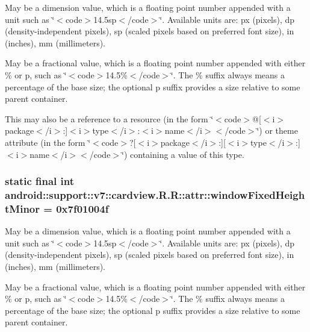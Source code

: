May be a dimension value, which is a floating point number appended with a unit such as \char`\"{}$<$code$>$14.5sp$<$/code$>$\char`\"{}. Available units are: px (pixels), dp (density-independent pixels), sp (scaled pixels based on preferred font size), in (inches), mm (millimeters). 

May be a fractional value, which is a floating point number appended with either \% or p, such as \char`\"{}$<$code$>$14.5\%$<$/code$>$\char`\"{}. The \% suffix always means a percentage of the base size; the optional p suffix provides a size relative to some parent container. 

This may also be a reference to a resource (in the form \char`\"{}$<$code$>$@\mbox{[}$<$i$>$package$<$/i$>$:\mbox{]}$<$i$>$type$<$/i$>$:$<$i$>$name$<$/i$>$$<$/code$>$\char`\"{}) or theme attribute (in the form \char`\"{}$<$code$>$?\mbox{[}$<$i$>$package$<$/i$>$:\mbox{]}\mbox{[}$<$i$>$type$<$/i$>$:\mbox{]}$<$i$>$name$<$/i$>$$<$/code$>$\char`\"{}) containing a value of this type. \hypertarget{classandroid_1_1support_1_1v7_1_1cardview_1_1_r_1_1attr_a01b43cb3c5747671e4ca146335eb990}{
\subsubsection[{windowFixedHeightMinor}]{\setlength{\rightskip}{0pt plus 5cm}static final int android::support::v7::cardview.R.R::attr::windowFixedHeightMinor = 0x7f01004f}}
\label{classandroid_1_1support_1_1v7_1_1cardview_1_1_r_1_1attr_a01b43cb3c5747671e4ca146335eb990}


May be a dimension value, which is a floating point number appended with a unit such as \char`\"{}$<$code$>$14.5sp$<$/code$>$\char`\"{}. Available units are: px (pixels), dp (density-independent pixels), sp (scaled pixels based on preferred font size), in (inches), mm (millimeters). 

May be a fractional value, which is a floating point number appended with either \% or p, such as \char`\"{}$<$code$>$14.5\%$<$/code$>$\char`\"{}. The \% suffix always means a percentage of the base size; the optional p suffix provides a size relative to some parent container. 

